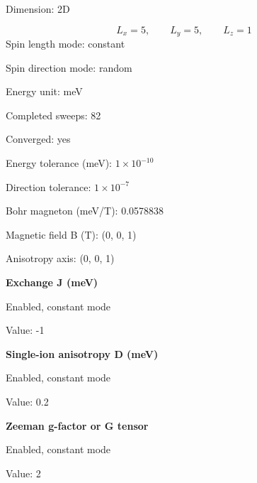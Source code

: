\documentclass[12pt,a4paper]{article}
\numberwithin{equation}{section}
\numberwithin{figure}{section}
\numberwithin{table}{section}
\begin{document}
	
Dimension: 2D\par
\[
L_x = 5,\qquad L_y = 5,\qquad L_z = 1
\]
Spin length mode: constant\par
Spin direction mode: random\par
Energy unit: meV\par
Completed sweeps: 82\par
Converged: yes\par
Energy tolerance (meV): $1\times 10^{-10}$\par
Direction tolerance: $1\times 10^{-7}$\par
Bohr magneton (meV/T): 0.0578838\par
Magnetic field B (T): (0, 0, 1)\par
Anisotropy axis: (0, 0, 1)\par

\par\medskip\noindent\textbf{Exchange J (meV)}\par
Enabled, constant mode\par
Value: -1\par

\par\medskip\noindent\textbf{Single-ion anisotropy D (meV)}\par
Enabled, constant mode\par
Value: 0.2\par

\par\medskip\noindent\textbf{Zeeman g-factor or G tensor}\par
Enabled, constant mode\par
Value: 2\par
	
	\clearpage
	
\end{document}
